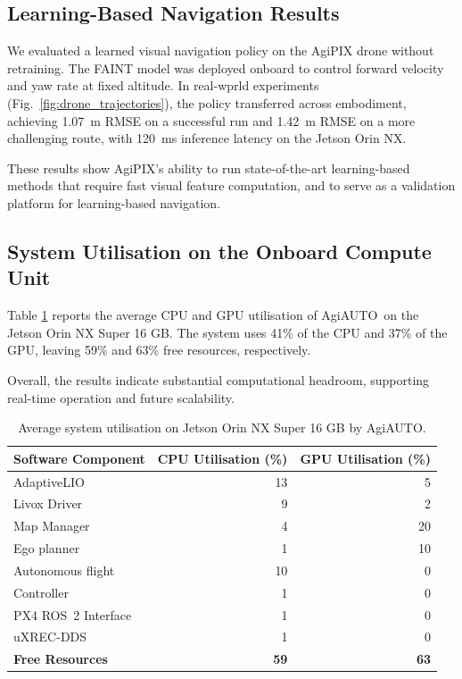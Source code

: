 \documentclass[letterpaper, 10 pt, conference]{ieeeconf}  %
\newcommand{\Agipix}{AgiPIX}
\newcommand{\Agiautonomy}{AgiAUTO}
\newcommand{\Agipixs}{AgiPIX }
\begin{document}
\subsection{Learning-Based Navigation Results}\label{subsec:results.learning}
We evaluated a learned visual navigation policy on the \Agipixs drone without retraining. The FAINT model \cite{suomela2025synthetic} was deployed onboard to control forward velocity and yaw rate at fixed altitude. In real-wprld experiments (Fig.~\ref{fig:drone_trajectories}), the policy transferred across embodiment, achieving \SI{1.07}{\meter} RMSE on a successful run and \SI{1.42}{\meter} RMSE on a more challenging route, with \SI{120}{\milli\second} inference latency on the Jetson Orin NX.

These results show \Agipix's ability to run state-of-the-art learning-based methods that require fast visual feature computation, and to serve as a validation platform for learning-based navigation.

\subsection{System Utilisation on the Onboard Compute Unit}

Table \ref{tab:utilization_table} reports the average CPU and GPU utilisation of \Agiautonomy\ on the Jetson Orin NX Super 16 GB. The system uses 41\% of the CPU and 37\% of the GPU, leaving 59\% and 63\% free resources, respectively.


Overall, the results indicate substantial computational headroom, supporting real-time operation and future scalability.

\begin{table}[!ht]
    \centering
    \footnotesize
    \def\arraystretch{1.2}
    \begin{tabularx}{\linewidth}{l|r|r}
        \toprule
        \parbox{3.3cm}{\textbf{Software Component}} & \parbox{2cm}{\centering\textbf{CPU Utilisation (\%)}} & \parbox{2cm}{\centering\textbf{GPU Utilisation (\%)}}\\
        \midrule
        AdaptiveLIO & 13 & 5 \\
        Livox Driver & 9 & 2 \\
        Map Manager & 4 & 20 \\
        Ego planner & 1 & 10 \\
        Autonomous flight & 10 & 0 \\
        Controller & 1 & 0 \\
        PX4 ROS~2 Interface & 1 & 0 \\
        uXREC-DDS & 1 & 0 \\
        \midrule
        \textbf{Free Resources} & \textbf{59} & \textbf{63} \\
        \bottomrule
    \end{tabularx}
    \caption{Average system utilisation on Jetson Orin NX Super 16 GB by \Agiautonomy.}
    \label{tab:utilization_table}
    \vspace*{-12pt}
\end{table}
\end{document}
